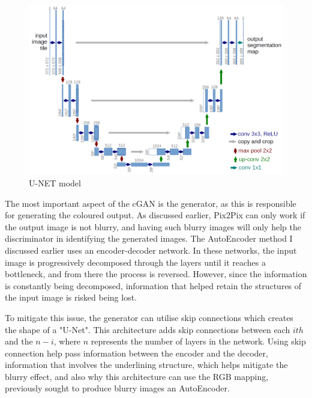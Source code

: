 \begin{figure}[H]
    \centering
    \includegraphics[width=0.7\columnwidth]{sections/figures/U-net.JPG}
    \caption{U-NET model \cite{RFB15a}}
    \label{fig:my_label}
\end{figure}

The most important aspect of the cGAN is the generator, as this is responsible for generating the coloured output. As discussed earlier, Pix2Pix can only work if the output image is not blurry, and having such blurry images will only help the discriminator in identifying the generated images. The AutoEncoder method I discussed earlier uses an encoder-decoder network. In these networks, the input image is progressively decomposed through the layers until it reaches a bottleneck, and from there the process is reversed. However, since the information is constantly being decomposed, information that helped retain the structures of the input image is risked being lost.

To mitigate this issue, the generator can utilise skip connections which creates the shape of a "U-Net". This architecture adds skip connections between each \(ith\) and the \(n - i\), where \(n\) represents the number of layers in the network. Using skip connection help pass information between the encoder and the decoder, information that involves the underlining structure, which helps mitigate the blurry effect, and also why this architecture can use the RGB mapping, previously sought to produce blurry images an AutoEncoder. 

